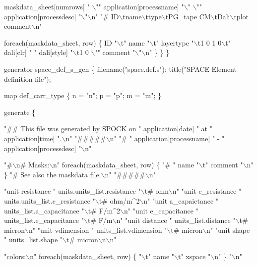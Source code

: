         maskdata_sheet[numrows]
        " \(\backslash\)"" application[processname] "\(\backslash\)" \(\backslash\)"" application[processdesc] "\(\backslash\)"\(\backslash\)n"
        "# ID\(\backslash\)tname\(\backslash\)ttype\(\backslash\)tPG_tape CM\(\backslash\)tDali\(\backslash\)tplot  comment\(\backslash\)n"

        foreach(maskdata_sheet, row) \{
            ID
            "\(\backslash\)t" name "\(\backslash\)t"
            layertype
            "\(\backslash\)t1 0     1 0\(\backslash\)t"
            dali[clr] " "
            dali[style]
            "\(\backslash\)t1 0   \(\backslash\)""
            comment
            "\(\backslash\)"\(\backslash\)n"
        \}
    \}
\}

generator space_def_s_gen
\{
    filename("space.def.s");
    title("SPACE Element definition file");

    map def_carr_type \{
        n = "n";
        p = "p";
        m = "m";
    \}

    generate \{

        "## This file was generated by SPOCK on " application[date]
        " at " application[time] ".\(\backslash\)n"
        "#####\(\backslash\)n"
        "# " application[processname] " - " application[processdesc] "\(\backslash\)n"

        "#\(\backslash\)n# Masks:\(\backslash\)n"
        foreach(maskdata_sheet, row) \{
            "# " name "\(\backslash\)t" comment "\(\backslash\)n"
        \}
        "# See also the maskdata file.\(\backslash\)n"
        "#####\(\backslash\)n"

        "unit resistance    "   units.units_list.resistance "\(\backslash\)t# ohm\(\backslash\)n"
        "unit c_resistance  "   units.units_list.c_resistance "\(\backslash\)t# ohm/m^2\(\backslash\)n"
        "unit a_capaictance "   units_list.a_capacitance "\(\backslash\)t# F/m^2\(\backslash\)n"
        "unit e_capacitance "   units_list.e_capacitance "\(\backslash\)t# F/m\(\backslash\)n"
        "unit distance      "   units_list.distance "\(\backslash\)t# micron\(\backslash\)n"
        "unit vdimension    "   units_list.vdimension "\(\backslash\)t# micron\(\backslash\)n"
        "unit shape         "   units_list.shape "\(\backslash\)t# micron\(\backslash\)n\(\backslash\)n"

        "colors:\(\backslash\)n"
         foreach(maskdata_sheet, row) \{
            "\(\backslash\)t" name "\(\backslash\)t" xspace "\(\backslash\)n"
         \}
         "\(\backslash\)n"

